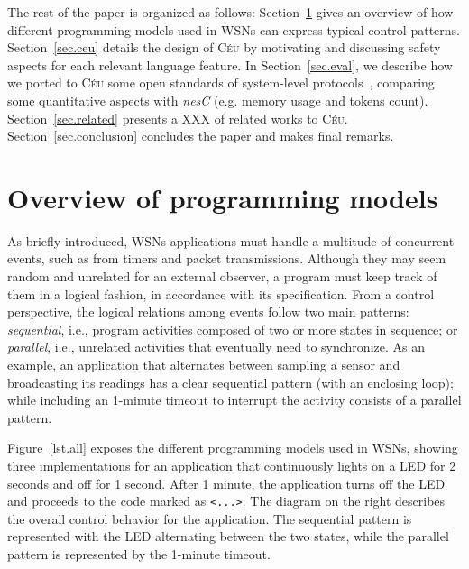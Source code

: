 \documentclass[10pt]{sensys-proc}
\newcommand{\CEU}{\textsc{C\'{e}u}\xspace}
\newcommand{\code}[1] {{\small{\texttt{#1}}}}
\begin{document}
The rest of the paper is organized as follows:
Section~\ref{sec.overview} gives an overview of how different programming 
models used in WSNs can express typical control patterns.
Section~\ref{sec.ceu} details the design of \CEU by motivating and discussing 
safety aspects for each relevant language feature.
In Section~\ref{sec.eval}, we describe how we ported to \CEU some open 
standards of system-level protocols~\cite{wsn.teps},
comparing some quantitative aspects with \emph{nesC} (e.g. memory usage and 
tokens count).%
Section~\ref{sec.related} presents a XXX of related works to \CEU.
Section~\ref{sec.conclusion} concludes the paper and makes final remarks.

\section{Overview of programming models}
\label{sec.overview}

As briefly introduced, WSNs applications must handle a multitude of concurrent 
events, such as from timers and packet transmissions.
Although they may seem random and unrelated for an external observer, a
program must keep track of them in a logical fashion, in accordance with its 
specification.
%
From a control perspective, the logical relations among events follow two main 
patterns: \emph{sequential}, i.e., program activities composed of two or more 
states in sequence; or \emph{parallel}, i.e., unrelated activities that 
eventually need to synchronize.
%
As an example, an application that alternates between sampling a sensor and 
broadcasting its readings has a clear sequential pattern (with an enclosing 
loop); while including an 1-minute timeout to interrupt the activity consists 
of a parallel pattern.


Figure~\ref{lst.all} exposes the different programming models used in WSNs, 
showing three implementations for an application that continuously lights on a 
LED for 2 seconds and off for 1 second.
After 1 minute, the application turns off the LED and proceeds to the code 
marked as \code{<...>}.
The diagram on the right describes the overall control behavior for the 
application.
The sequential pattern is represented with the LED alternating between the two 
states, while the parallel pattern is represented by the 1-minute timeout.
\end{document}
